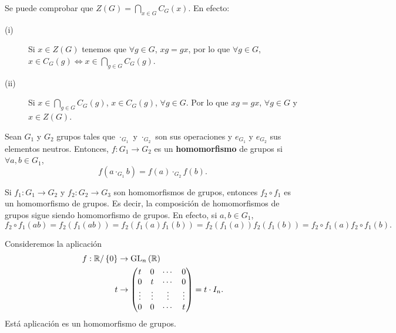 \begin{observation}
Se puede comprobar que $\displaystyle Z\left(G\right) = \bigcap_{x \in G}C_{G}\left(x\right) $. En efecto:
\begin{description}
\item[(i)] Si $\displaystyle x \in Z\left(G\right) $ tenemos que $\displaystyle \forall g \in G $, $\displaystyle x g = g x $, por lo que $\displaystyle \forall g \in G $, $\displaystyle x \in C_{G}\left(g\right) \iff x \in \bigcap_{g \in G}C_{G}\left(g\right) $.
\item[(ii)] Si $\displaystyle x \in \bigcap_{g \in G}C_{G}\left(g\right) $, $\displaystyle x \in C_{G}\left(g\right) $, $\displaystyle \forall g \in G $. Por lo que $\displaystyle xg = gx $, $\displaystyle \forall g \in G $ y $\displaystyle x \in Z\left(G\right) $.
\end{description}
\end{observation}
\begin{definition}[Homomorfismo]
Sean $\displaystyle G_{1} $ y $\displaystyle G_{2} $ grupos tales que $\displaystyle \cdot _{G_{1}} $ y $\displaystyle \cdot _{G_{2}} $ son sus operaciones y $\displaystyle e_{G_{1}} $ y $\displaystyle e_{G_{2}} $ sus elementos neutros. Entonces, $\displaystyle f : G_{1} \to G_{2} $ es un \textbf{homomorfismo} de grupos si $\displaystyle \forall a,b \in G_{1} $, 
\[f\left(a \cdot _{G_{1}} b\right) = f\left(a\right) \cdot _{G_{2}}f\left(b\right) .\]
\end{definition}
\begin{observation}
Si $\displaystyle f_{1}: G_{1} \to G_{2} $ y $\displaystyle f_{2} : G_{2} \to G_{3} $ son homomorfismos de grupos, entonces $\displaystyle f_{2} \circ f_{1} $ es un homomorfismo de grupos. Es decir, la composición de homomorfismos de grupos sigue siendo homomorfismo de grupos. En efecto, si $\displaystyle a,b \in G_{1} $, 
\[f_{2}\circ f_{1}\left(ab\right) = f_{2}\left(f_{1}\left(ab\right)\right) = f_{2}\left(f_{1}\left(a\right)f_{1}\left(b\right)\right) = f_{2}\left(f_{1}\left(a\right)\right)f_{2}\left(f_{1}\left(b\right)\right) = f_{2} \circ f_{1}\left(a\right) f_{2}\circ f_{1}\left(b\right).\]
\end{observation}
\begin{eg}
Consideremos la aplicación 
\[
\begin{split}
	f : \mathbb{R}/ \left\{ 0\right\}  & \to \operatorname{GL}_{n}\left(\mathbb{R}\right) \\
	t & \to \begin{pmatrix} t & 0 & \cdots & 0 \\
	0 & t & \cdots & 0 \\
\vdots & \vdots & \vdots & \vdots \\
0 & 0 & \cdots & t\end{pmatrix} = t \cdot I_{n}.
\end{split}
\]
Está aplicación es un homomorfismo de grupos.
\end{eg}
